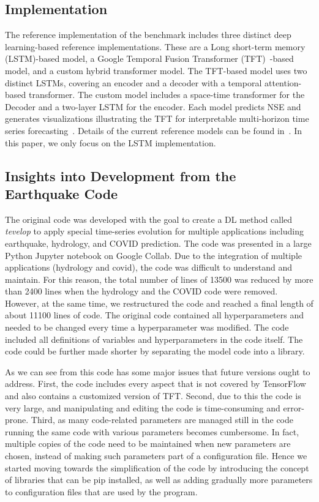 \documentclass[utf8]{FrontiersinVancouver} %
\begin{document}
\subsection{Implementation}

The reference implementation of the benchmark includes three distinct
deep learning-based reference implementations. These are a Long
short-term memory (LSTM)-based model, a Google Temporal Fusion
Transformer (TFT)~\citep{TFT-21}-based model, and a custom hybrid
transformer model. The TFT-based model uses two distinct LSTMs,
covering an encoder and a decoder with a temporal attention-based
transformer. The custom model includes a space-time transformer for
the Decoder and a two-layer LSTM for the encoder. Each model predicts
NSE and generates visualizations illustrating the TFT for
interpretable multi-horizon time series
forecasting~\citep{TFT-21}. Details of the current reference models
can be found in~\citep{fox2022-jm}.  In this paper, we only focus on
the LSTM implementation.

\subsection{Insights into Development from the Earthquake Code}

The original code was developed with the goal to create a DL method
called {\em tevelop} to apply special time-series evolution for
multiple applications including earthquake, hydrology, and COVID
prediction. The code was presented in a large Python Jupyter notebook
on Google Collab.  Due to the integration of multiple applications (hydrology and covid), the
code was difficult to understand and maintain. For this reason, the
total number of lines of 13500 was reduced by more than 2400 lines
when the hydrology and the COVID code were removed.  However, at the
same time, we restructured the code and reached a final length of about
11100 lines of code.  The original code contained all hyperparameters
and needed to be changed every time a hyperparameter was modified.
The code included all definitions of variables and hyperparameters in
the code itself. The code could be further made shorter by separating the model code into a library.

As we can see from this code has some major issues that future
versions ought to address. First, the code includes every aspect that
is not covered by TensorFlow and also contains a customized version of
TFT. Second, due to this the code is very large, and manipulating and
editing the code is time-consuming and error-prone. Third, as many
code-related parameters are managed still in the code running the same
code with various parameters becomes cumbersome. In fact, multiple
copies of the code need to be maintained when new parameters are
chosen, instead of making such parameters part of a configuration
file. Hence we started moving towards the simplification of the code
by introducing the concept of libraries that can be pip installed, as
well as adding gradually more parameters to configuration files that
are used by the program.
\end{document}
